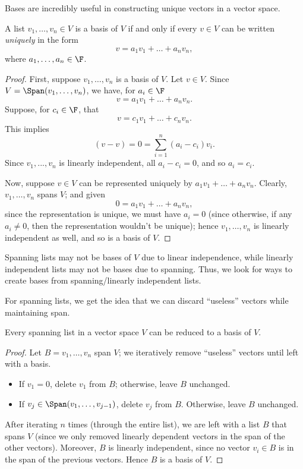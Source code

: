 \documentclass[math0540-lecture-notes.tex]{subfiles}
\begin{document}
Bases are incredibly useful in constructing unique vectors in a vector space. 
\begin{proposition}{}
  A list $v_1,\ldots,v_n\in V$ is a basis of $V$ if and only if every $v\in V$ can be written
  \textit{uniquely} in the form \[
    v = a_1v_1+\ldots+a_nv_n
  ,\] where $a_1,\ldots,a_n\in \F$.
\end{proposition}
\begin{proof}[Proof]
  First, suppose $v_1,\ldots,v_n$ is a basis of $V$. Let $v\in V$. Since $V=\Span(v_1,\ldots,v_n)$,
  we have, for $a_i\in \F$ \[
    v = a_1v_1+\ldots+a_nv_n
  .\] Suppose, for $c_i\in \F$, that \[
    v = c_1v_1+\ldots+c_nv_n
  .\] This implies \[
    (v-v) = 0 = \sum_{i=1}^{n} (a_i-c_i)v_i
  .\] Since $ v_1,...,v_n$ is linearly independent, all $a_i-c_i=0$, and so $a_i=c_i$.

  Now, suppose  $v\in V$ can be represented uniquely by $ a_1v_1+\ldots+a_nv_n$. Clearly,
  $v_1,\ldots,v_n$ spans $V$; and given \[
    0 = a_1v_1+\ldots+a_nv_n
  ,\] since the representation is unique, we must have $a_i=0$ (since otherwise, if any $a_i\neq 0$,
  then the representation wouldn't be unique); hence $v_1,\ldots,v_n$ is linearly independent as
  well, and so is a basis of $V$.
\end{proof}

Spanning lists may not be bases of $V$ due to linear independence, while linearly independent lists
may not be bases due to spanning. Thus, we look for ways to create bases from spanning/linearly
independent lists.

For spanning lists, we get the idea that we can discard ``useless'' vectors while maintaining span.
\begin{proposition}{}
  Every spanning list in a vector space $V$ can be reduced to a basis of $V$.
\end{proposition}
\begin{proof}[Proof]
  Let $B=v_1,\ldots,v_n$ span $V$; we iteratively remove ``useless'' vectors until left with a basis.
  \begin{itemize}
    \item If $v_1=0$, delete $v_1$ from $B$; otherwise, leave $B$ unchanged.
    \item If $v_j\in \Span(v_1,\ldots,v_{j-1})$, delete $v_j$ from $B$. Otherwise, leave $B$ 
      unchanged.
  \end{itemize}
  After iterating $n$ times (through the entire list), we are left with a list $B$ that spans $V$ 
  (since we only removed linearly dependent vectors in the span of the other vectors). Moreover, $B$ 
  is linearly independent, since no vector $v_i\in B$ is in the span of the previous vectors. Hence
  $B$ is a basis of $V$.
\end{proof}
\end{document}
